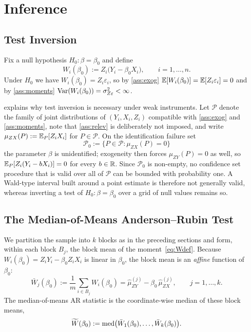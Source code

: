 \section{Inference}
\label{s:inference}

\subsection{Test Inversion}
\label{ss:inversion}

Fix a null hypothesis $H_0\colon \beta = \beta_0$ and define
\begin{equation}
  W_i(\beta_0) := Z_i\bigl(Y_i - \beta_0 X_i\bigr), \qquad i = 1,\dots,n.
  \label{eq:Wdef}
\end{equation}
Under $H_0$ we have $W_i(\beta_0) = Z_i\varepsilon_i$, so by \ref{ass:exog} $\operatorname{\mathbb{E}}[W_i(\beta_0)] = \operatorname{\mathbb{E}}[Z_i\varepsilon_i] = 0$ and by \ref{ass:moments} $\operatorname{Var}(W_i(\beta_0)) = \sigma_{Z\varepsilon}^2 < \infty$.

\citet{dufour1997some} explains why test inversion is necessary under weak
instruments. Let $\mathcal{P}$ denote the family of joint distributions of
$(Y_i, X_i, Z_i)$ compatible with \ref{ass:exog} and \ref{ass:moments},
note that \ref{ass:relev} is deliberately not imposed, and write
$\mu_{ZX}(P) := \operatorname{\mathbb{E}}_P[Z_iX_i]$ for $P \in \mathcal{P}$. On the identification
failure set
\[
  \mathcal{P}_0 := \bigl\{P \in \mathcal{P} : \mu_{ZX}(P) = 0\bigr\}
\]
the parameter $\beta$ is unidentified; exogeneity then forces
$\mu_{ZY}(P) = 0$ as well, so $\operatorname{\mathbb{E}}_P[Z_i(Y_i - bX_i)] = 0$ for every
$b \in \mathbb{R}$. Since $\mathcal{P}_0$ is non-empty, no confidence set procedure
that is valid over all of $\mathcal{P}$ can be bounded with probability one.
A Wald-type interval built around a point estimate is therefore not
generally valid, whereas inverting a test of $H_0\colon\beta=\beta_0$ over
a grid of null values remains so.

\subsection{The Median-of-Means Anderson--Rubin Test}
\label{sec:mom_ar_test}

We partition the sample into $k$ blocks as in the preceding sections and form, within each block $B_j$, the block mean of the moment~\eqref{eq:Wdef}. Because $W_i(\beta_0) = Z_iY_i - \beta_0 Z_iX_i$ is linear in $\beta_0$, the block mean is
an \emph{affine} function of $\beta_0$:
\begin{equation}
  \bar{W}_j(\beta_0)
    := \frac{1}{m}\sum_{i\in B_j} W_i(\beta_0)
    = \hat{\mu}_{ZY}^{(j)} - \beta_0\,\hat{\mu}_{ZX}^{(j)},
    \qquad j = 1,\dots,k.
  \label{eq:Wbar}
\end{equation}
The median-of-means AR statistic is the coordinate-wise median of these block
means,
\begin{equation}
  \widetilde{W}(\beta_0)
    := \operatorname{med}\bigl(\bar{W}_1(\beta_0),\dots,\bar{W}_k(\beta_0)\bigr).
  \label{eq:Wtilde}
\end{equation}


